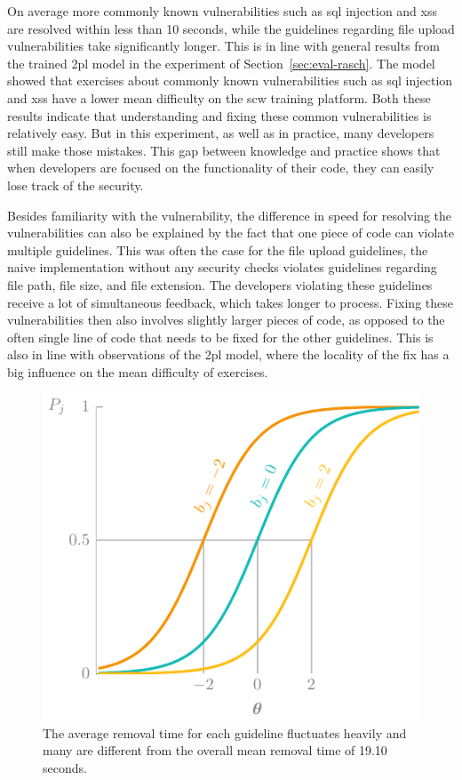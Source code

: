 On average more commonly known vulnerabilities such as \gls{sql} injection and \gls{xss} are resolved within less than 10 seconds, while the guidelines regarding file upload vulnerabilities take significantly longer.
This is in line with general results from the trained \gls{2pl} model in the experiment of Section~\ref{sec:eval-rasch}.
The model showed that exercises about commonly known vulnerabilities such as \gls{sql} injection and \gls{xss} have a lower mean difficulty on the \gls{scw} training platform.
Both these results indicate that understanding and fixing these common vulnerabilities is relatively easy.
But in this experiment, as well as in practice, many developers still make those mistakes.
This gap between knowledge and practice shows that when developers are focused on the functionality of their code, they can easily lose track of the security.

Besides familiarity with the vulnerability, the difference in speed for resolving the vulnerabilities can also be explained by the fact that one piece of code can violate multiple guidelines.
This was often the case for the file upload guidelines, the naive implementation without any security checks violates guidelines regarding file path, file size, and file extension.
The developers violating these guidelines receive a lot of simultaneous feedback, which takes longer to process.
Fixing these vulnerabilities then also involves slightly larger pieces of code, as opposed to the often single line of code that needs to be fixed for the other guidelines.
This is also in line with observations of the \gls{2pl} model, where the locality of the fix has a big influence on the mean difficulty of exercises.

\begin{figure}
  \centering
  \includegraphics[page=19]{03-education/figures/tikzfigures.pdf}
  \caption[Average removal time of guidelines]{The average removal time for each guideline fluctuates heavily and many are different from the overall mean removal time of 19.10 seconds.}
  \label{fig:fixtimes}
\end{figure}


